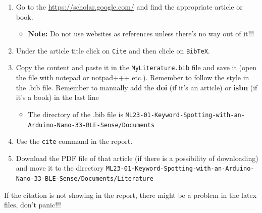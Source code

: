 \begin{enumerate}
	\item Go to the \url{https://scholar.google.com/} and find the appropriate article or book.
	
	\begin{itemize}
		\item \textbf{Note:} Do not use websites as references unless there's no way out of it!!!
	\end{itemize}
	
	\item Under the article title click on \texttt{Cite} and then clicle on \texttt{BibTeX}.
	\item Copy the content and paste it in the \texttt{MyLiterature.bib} file and save it (open the file with notepad or notpad+++ etc.). Remember to follow the style in the .bib file. Remember to manually add the \textbf{doi} (if it's an article) or \textbf{isbn} (if it's a book) in the last line
	
	\begin{itemize}
		\item The directory of the .bib file is \texttt{ML23-01-Keyword-Spotting-with-an-Arduino-Nano-33-BLE-Sense/Documents}
	\end{itemize}
	
	\item Use the \texttt{cite{}} command in the report.
	\item Download the PDF file of that article (if there is a possibility of downloading) and move it to the directory \texttt{ML23-01-Keyword-Spotting-with-an-Arduino-Nano-33-BLE-Sense/Documents/Literature}
\end{enumerate}

If the citation is not showing in the report, there might be a problem in the latex files, don't panic!!!
